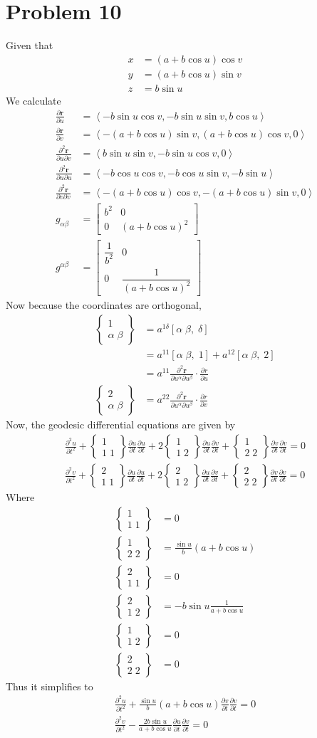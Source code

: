 \documentclass[12pt]{article}
\newcommand{\eq}[1]{\begin{align*}#1\end{align*}}
\newcommand{\p}[2]{\frac{\partial#1}{\partial#2}}
\newcommand{\pp}[3]{\frac{\partial^2#1}{\partial#2\partial#3}}
\newcommand{\mat}[2]{\left[\begin{array}{#1}#2\end{array}\right]}
\newcommand{\crsf}[3]{\left[#1\;#2,\;#3\right]}
\newcommand{\crss}[3]{\left\{\begin{array}{c}#1\\#2\;#3\end{array}\right\}}
\begin{document}
\section*{Problem 10}
Given that
\eq{
	x &= (a + b\cos u)\cos v\\
	y &= (a + b\cos u)\sin v\\
	z &= b\sin u
}
We calculate
\eq{
	\p{\bm{r}}{u} &= \left\langle -b\sin u \cos v, -b\sin u \sin v, b\cos u \right\rangle\\
	\p{\bm{r}}{v} &= \left\langle -(a + b\cos u)\sin v, (a + b\cos u)\cos v, 0 \right\rangle\\
	\pp{\bm{r}}{u}{v} &= \left\langle b\sin u\sin v, -b\sin u \cos v, 0 \right\rangle\\
	\pp{\bm{r}}{u}{u} &= \left\langle -b \cos u \cos v, - b\cos u\sin v, -b\sin u \right\rangle\\
	\pp{\bm{r}}{v}{v} &= \left\langle -(a + b\cos u)\cos v, -(a + b\cos u)\sin v, 0 \right\rangle\\
	g_{\alpha\beta} &= \mat{cc}{
		b^2 & 0 \\
		0 & (a + b\cos u)^2
	}\\
	g^{\alpha\beta} &= \mat{cc}{
		\dfrac{1}{b^2} & 0 \\
		0 & \dfrac{1}{(a + b\cos u)^2}
	}
}
Now because the coordinates are orthogonal,
\eq{
	\crss{1}{\alpha}{\beta} &= a^{1\delta}\crsf{\alpha}{\beta}{\delta}\\
	&= a^{1 1}\crsf{\alpha}{\beta}{1} + a^{1 2}\crsf{\alpha}{\beta}{2}\\
	&= a^{1 1}\pp{\bm{r}}{u^\alpha}{u^\beta}\cdot\p{r}{u}\\
	\crss{2}{\alpha}{\beta} &= a^{22}\pp{\bm{r}}{u^\alpha}{u^\beta}\cdot\p{r}{v}
}
Now, the geodesic differential equations are given by
\eq{
	\p{^2u}{t^2} + \crss{1}{1}{1}\p{u}{t}\p{u}{t} + 2\crss{1}{1}{2}\p{u}{t}\p{v}{t} + \crss{1}{2}{2}\p{v}{t}\p{v}{t} = 0\\
	\p{^2v}{t^2} + \crss{2}{1}{1}\p{u}{t}\p{u}{t} + 2\crss{2}{1}{2}\p{u}{t}\p{v}{t} + \crss{2}{2}{2}\p{v}{t}\p{v}{t} = 0
}
Where
\eq{
	\crss{1}{1}{1} &= 0\\
	\crss{1}{2}{2} &= \frac{\sin u}{b}(a + b\cos u)\\
	\crss{2}{1}{1} &= 0\\
	\crss{2}{1}{2} &= -b\sin u \frac{1}{a + b\cos u}\\
	\crss{1}{1}{2} &= 0\\
	\crss{2}{2}{2} &= 0
}
Thus it simplifies to
\eq{
	\p{^2u}{t^2} + \frac{\sin u}{b}(a + b\cos u)\p{v}{t}\p{v}{t} = 0\\
	\p{^2v}{t^2} - \frac{2b\sin u}{a + b\cos u}\p{u}{t}\p{v}{t} = 0
}
\end{document}
